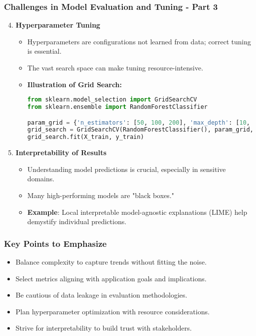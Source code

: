 \documentclass[aspectratio=169]{beamer}
\begin{document}
\begin{frame}[fragile]
    \frametitle{Challenges in Model Evaluation and Tuning - Part 3}
    \begin{enumerate}
        \setcounter{enumi}{3}
        \item \textbf{Hyperparameter Tuning}
        \begin{itemize}
            \item Hyperparameters are configurations not learned from data; correct tuning is essential.
            \item The vast search space can make tuning resource-intensive.
            \item \textbf{Illustration of Grid Search:}
            \begin{lstlisting}[language=Python]
from sklearn.model_selection import GridSearchCV
from sklearn.ensemble import RandomForestClassifier

param_grid = {'n_estimators': [50, 100, 200], 'max_depth': [10, 20, None]}
grid_search = GridSearchCV(RandomForestClassifier(), param_grid, cv=5)
grid_search.fit(X_train, y_train)
            \end{lstlisting}
        \end{itemize}

        \item \textbf{Interpretability of Results}
        \begin{itemize}
            \item Understanding model predictions is crucial, especially in sensitive domains.
            \item Many high-performing models are "black boxes."
            \item \textbf{Example}: Local interpretable model-agnostic explanations (LIME) help demystify individual predictions.
        \end{itemize}
    \end{enumerate}
\end{frame}

\begin{frame}[fragile]
    \frametitle{Key Points to Emphasize}
    \begin{itemize}
        \item Balance complexity to capture trends without fitting the noise.
        \item Select metrics aligning with application goals and implications.
        \item Be cautious of data leakage in evaluation methodologies.
        \item Plan hyperparameter optimization with resource considerations.
        \item Strive for interpretability to build trust with stakeholders.
    \end{itemize}
\end{frame}
\end{document}
